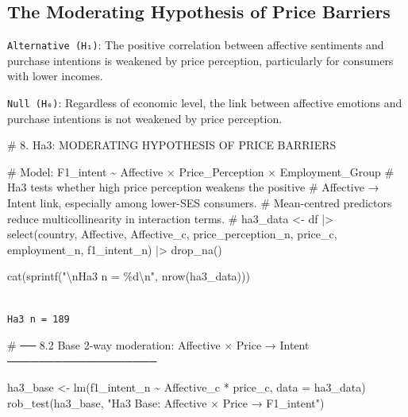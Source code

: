 \documentclass[
  letterpaper,
  DIV=11,
  numbers=noendperiod]{scrartcl}
\newenvironment{Shaded}{\begin{snugshade}}{\end{snugshade}}
\newcommand{\AttributeTok}[1]{\textcolor[rgb]{0.40,0.45,0.13}{#1}}
\newcommand{\CommentTok}[1]{\textcolor[rgb]{0.37,0.37,0.37}{#1}}
\newcommand{\FunctionTok}[1]{\textcolor[rgb]{0.28,0.35,0.67}{#1}}
\newcommand{\NormalTok}[1]{\textcolor[rgb]{0.00,0.23,0.31}{#1}}
\newcommand{\OtherTok}[1]{\textcolor[rgb]{0.00,0.23,0.31}{#1}}
\newcommand{\SpecialCharTok}[1]{\textcolor[rgb]{0.37,0.37,0.37}{#1}}
\newcommand{\StringTok}[1]{\textcolor[rgb]{0.13,0.47,0.30}{#1}}
\begin{document}
\subsection{The Moderating Hypothesis of Price
Barriers}\label{the-moderating-hypothesis-of-price-barriers}

\texttt{Alternative\ (H₁)}: The positive correlation between affective
sentiments and purchase intentions is weakened by price perception,
particularly for consumers with lower incomes.

\texttt{Null\ (H₀)}: Regardless of economic level, the link between
affective emotions and purchase intentions is not weakened by price
perception.

\begin{Shaded}
\begin{Highlighting}[]
\CommentTok{\# 8.  Ha3: MODERATING HYPOTHESIS OF PRICE BARRIERS}

\CommentTok{\#  Model:  F1\_intent \textasciitilde{} Affective × Price\_Perception × Employment\_Group}
\CommentTok{\#  Ha3 tests whether high price perception weakens the positive}
\CommentTok{\#  Affective → Intent link, especially among lower{-}SES consumers.}
\CommentTok{\#  Mean{-}centred predictors reduce multicollinearity in interaction terms.}
\CommentTok{\# }
\NormalTok{ha3\_data }\OtherTok{\textless{}{-}}\NormalTok{ df }\SpecialCharTok{|\textgreater{}} 
  \FunctionTok{select}\NormalTok{(country, Affective, Affective\_c, price\_perception\_n, price\_c,}
\NormalTok{         employment\_n, f1\_intent\_n) }\SpecialCharTok{|\textgreater{}}
  \FunctionTok{drop\_na}\NormalTok{()}

\FunctionTok{cat}\NormalTok{(}\FunctionTok{sprintf}\NormalTok{(}\StringTok{"}\SpecialCharTok{\textbackslash{}n}\StringTok{Ha3 n = \%d}\SpecialCharTok{\textbackslash{}n}\StringTok{"}\NormalTok{, }\FunctionTok{nrow}\NormalTok{(ha3\_data)))}
\end{Highlighting}
\end{Shaded}

\begin{verbatim}

Ha3 n = 189
\end{verbatim}

\begin{Shaded}
\begin{Highlighting}[]
\CommentTok{\# ── 8.2  Base 2{-}way moderation: Affective × Price → Intent ───────────────────}

\NormalTok{ha3\_base }\OtherTok{\textless{}{-}} \FunctionTok{lm}\NormalTok{(f1\_intent\_n }\SpecialCharTok{\textasciitilde{}}\NormalTok{ Affective\_c }\SpecialCharTok{*}\NormalTok{ price\_c, }\AttributeTok{data =}\NormalTok{ ha3\_data)}
\FunctionTok{rob\_test}\NormalTok{(ha3\_base, }\StringTok{"Ha3 Base: Affective × Price → F1\_intent"}\NormalTok{)}
\end{Highlighting}
\end{Shaded}
\end{document}
